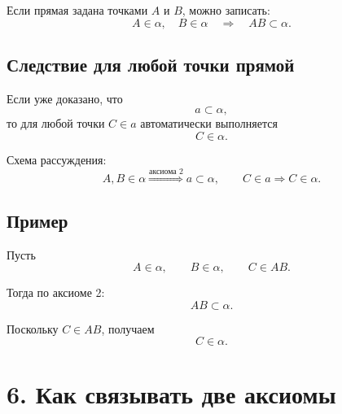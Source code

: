 \documentclass[a4paper,12pt]{article}
\begin{document}
Если прямая задана точками $A$ и $B$, можно записать:
\[
A\in\alpha,\quad B\in\alpha
\quad\Longrightarrow\quad
AB\subset\alpha.
\]

\begin{center}
\end{center}

\subsection*{\textcolor{accent}{Следствие для любой точки прямой}}

Если уже доказано, что
\[
a\subset\alpha,
\]
то для любой точки $C\in a$ автоматически выполняется
\[
C\in\alpha.
\]

Схема рассуждения:
\[
A,B\in\alpha
\overset{\text{аксиома 2}}{\Longrightarrow}
a\subset\alpha,
\qquad
C\in a
\Longrightarrow
C\in\alpha.
\]

\subsection*{\textcolor{accent}{Пример}}

Пусть
\[
A\in\alpha,\qquad B\in\alpha,\qquad C\in AB.
\]

Тогда по аксиоме 2:
\[
AB\subset\alpha.
\]

Поскольку $C\in AB$, получаем
\[
\boxed{C\in\alpha}.
\]


\section*{\textcolor{darkaccent}{6. Как связывать две аксиомы}}
\end{document}
